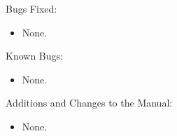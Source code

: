 \noindent Bugs Fixed:

\begin{itemize}

\item None.

\end{itemize}

\noindent Known Bugs:

\begin{itemize}

\item None.

\end{itemize}

\noindent Additions and Changes to the Manual:

\begin{itemize}

\item None.

\end{itemize}
